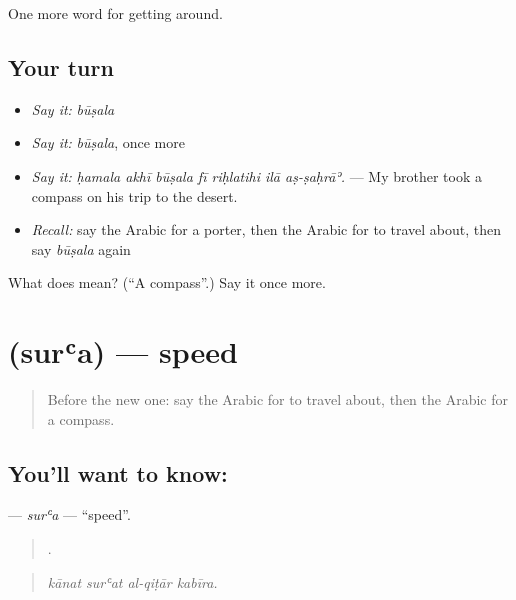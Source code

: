\begin{grammarlens}[title={What you've built}]
One more word for getting around.
\end{grammarlens}

\subsection*{Your turn}
\begin{itemize}
\raggedright
  \item \emph{Say it:} \emph{būṣala}
  \item \emph{Say it:} \emph{būṣala}, once more
  \item \emph{Say it:} \emph{ḥamala akhī būṣala fī riḥlatihi ilā aṣ-ṣaḥrāʾ.} — My brother took a compass on his trip to the desert.
  \item \emph{Recall:} say the Arabic for a porter, then the Arabic for to travel about, then say \emph{būṣala} again
\end{itemize}

\begin{tcolorbox}[breakable,colback=teal!4,colframe=teal!35!black,title={Before you move on}]
What does  mean? (\textquotedblleft{}A compass\textquotedblright{}.) Say it once more.
\end{tcolorbox}
\section[\texorpdfstring{\ar{سرعة} (surʿa)}{سرعة (surʿa)}]{ (surʿa) — speed}

\label{lesson:AR-C437-sura}



\begin{quote}
Before the new one: say the Arabic for to travel about, then the Arabic for a compass.
\end{quote}

\subsection*{You'll want to know: }
\textbf{} — \emph{surʿa} — \textquotedblleft{}speed\textquotedblright{}.

\begin{quote}
   .
\end{quote}

\begin{quote}
\emph{kānat surʿat al-qiṭār kabīra.}
\end{quote}

